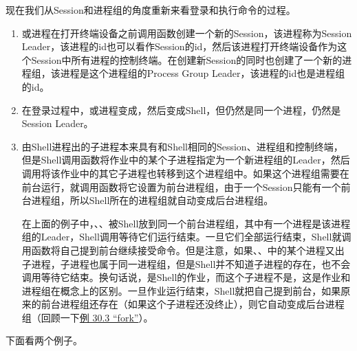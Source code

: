 

现在我们从Session和进程组的角度重新来看登录和执行命令的过程。


\begin{enumerate}

\item {}或进程在打开终端设备之前调用函数创建一个新的Session，该进程称为Session Leader，该进程的id也可以看作Session的id，然后该进程打开终端设备作为这个Session中所有进程的控制终端。在创建新Session的同时也创建了一个新的进程组，该进程是这个进程组的Process Group Leader，该进程的id也是进程组的id。

\item 在登录过程中，或进程变成，然后变成Shell，但仍然是同一个进程，仍然是Session Leader。

\item 由Shell进程出的子进程本来具有和Shell相同的Session、进程组和控制终端，但是Shell调用函数将作业中的某个子进程指定为一个新进程组的Leader，然后调用将该作业中的其它子进程也转移到这个进程组中。如果这个进程组需要在前台运行，就调用函数将它设置为前台进程组，由于一个Session只能有一个前台进程组，所以Shell所在的进程组就自动变成后台进程组。



在上面的例子中，、、被Shell放到同一个前台进程组，其中有一个进程是该进程组的Leader，Shell调用等待它们运行结束。一旦它们全部运行结束，Shell就调用函数将自己提到前台继续接受命令。但是注意，如果、、中的某个进程又出子进程，子进程也属于同一进程组，但是Shell并不知道子进程的存在，也不会调用等待它结束。换句话说，是Shell的作业，而这个子进程不是，这是作业和进程组在概念上的区别。一旦作业运行结束，Shell就把自己提到前台，如果原来的前台进程组还存在（如果这个子进程还没终止），则它自动变成后台进程组（回顾一下\hyperlink{db.ch30s03.id2866242}{例 30.\BookSplit{}3 “fork”}）。
\end{enumerate}


下面看两个例子。




